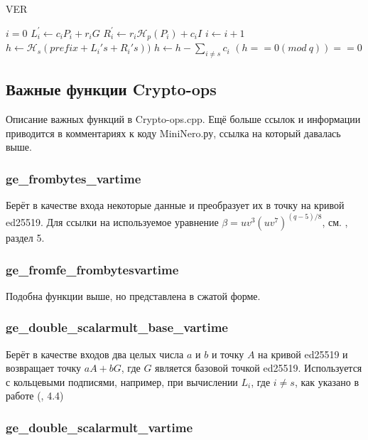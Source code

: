 \documentclass{mrl}
\numberwithin{equation}{section}
\numberwithin{figure}{section}
\begin{document}
\begin{algorithm}[H]
\caption{VER}

\begin{algorithmic}
\State $i=0$
	\State $L_i^{\prime}\gets c_i P_i + r_i  G$
	\State $R_i^{\prime}\gets r_i \mathcal{H}_p(P_i)+c_i I$
	\State $i \gets i+1$
\EndWhile
\State $h \gets \mathcal{H}_s(prefix+L_i's+R_i's))$
\State $h \gets h-\sum_{i\neq s} c_i$
 \State \Return $(h == 0 (mod\ q)) == 0$
\end{algorithmic}
\end{algorithm}

\subsection{Важные функции Crypto-ops}

Описание важных функций в Crypto-ops.cpp. Ещё больше ссылок и информации приводится в комментариях к коду MiniNero.ру, ссылка на который давалась выше.

\subsubsection{ge\_frombytes\_vartime}

Берёт в качестве входа некоторые данные и преобразует их в точку на кривой ed25519. Для ссылки на используемое уравнение $\beta=uv^{3}\left(uv^{7}\right)^{\left(q-5\right)/8}$, см. \cite{BBJLP},  раздел 5.


\subsubsection{ge\_fromfe\_frombytesvartime}

Подобна функции выше, но представлена в сжатой форме.

\subsubsection{ge\_double\_scalarmult\_base\_vartime}

Берёт в качестве входов два целых числа $a$ и $b$ и точку $A$ на кривой ed25519 и возвращает точку $aA+bG$, где $G$ является базовой точкой ed25519. Используется с кольцевыми подписями, например, при вычислении $ $$L_{i}$, где $i\neq s$, как указано в работе (\cite{CN}, 4.4)


\subsubsection{ge\_double\_scalarmult\_vartime}
\end{document}
